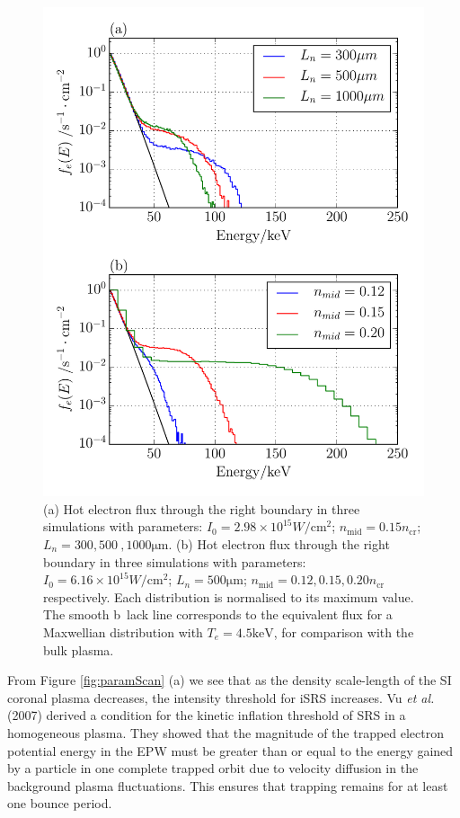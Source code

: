 \begin{figure}[ht]
   \centering
    \includegraphics[width=0.7\columnwidth]{Chapters/C4_iSRS/fig7_7a_7b.pdf}
    \caption{(a) Hot electron flux through the right boundary in three simulations with parameters: $I_0 = 2.98\times 10^{15} \si{W / \centi \metre^2}$; $n_\mathrm{mid}=0.15 n_\mathrm{cr}$; $L_n=300,500\
,1000\si{\micro\metre}$.   (b) Hot electron flux through the right boundary in three simulations with parameters:
   $I_0 = 6.16\times 10^{15} \si{W / \centi \metre^2}$;  $L_n=500\si{\micro\metre}$; $n_\mathrm{mid}=0.12,0.15,0.20 n_\mathrm{cr}$ respectively. Each distribution is normalised to its maximum value. The smooth b\
lack line corresponds to the equivalent flux for a Maxwellian
   distribution with $T_e=4.5\si{\kilo \electronvolt}$, for comparison with the
   bulk plasma.}
    \label{fig:hotelectrons}
\end{figure}{}

From Figure \ref{fig:paramScan} (a) we see that as the density scale-length of the SI coronal plasma decreases, the intensity threshold for iSRS increases. Vu \textit{et al.} (2007) \citep{Vu2007} derived a condition for the kinetic inflation threshold of SRS in a homogeneous plasma. They showed that the magnitude of the trapped electron potential energy in the EPW must be greater than or equal to the energy gained by a particle in one complete trapped orbit due to velocity diffusion in the
background plasma fluctuations. This ensures that trapping remains for at least one bounce period.


